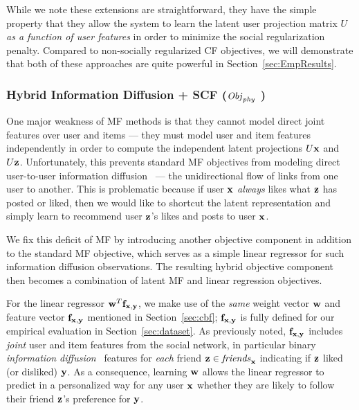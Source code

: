 While we note these extensions are straightforward, they have
the simple property that they allow the system to learn the latent
user projection matrix $U$ \emph{as a function of user features}
in order to minimize the social regularization penalty.
Compared to non-socially regularized CF objectives, we will
demonstrate that both of these approaches are quite powerful in 
Section~\ref{sec:EmpResults}.


\subsubsection{Hybrid Information Diffusion + SCF ($\mathit{Obj}_{\mathit{phy}}$ )}

One major weakness of MF methods is that they cannot model direct
joint features over user and items --- they must model user and item
features independently in order to compute the independent latent
projections $U\mathbf{x}$ and $U\mathbf{z}$.  Unfortunately, this prevents standard MF
objectives from modeling direct user-to-user information
diffusion~\cite{inf_diffusion} --- the 
unidirectional flow of links from one user to another.
This is problematic because if user $\mathbf{x}$ \emph{always} likes what $\mathbf{z}$
has posted or liked, then we would like to shortcut the latent
representation and simply learn to recommend user $\mathbf{z}$'s likes and posts 
to user $\mathbf{x}$.

We fix this deficit of MF by introducing another objective component
in addition to the standard MF objective, which serves as
a simple linear regressor for such information diffusion
observations.  The resulting hybrid objective component then becomes a
combination of latent MF and linear regression objectives.

For the linear regressor $\mathbf{w}^T \mathbf{f}_{\mathbf{x},\mathbf{y}}$, we make use of the
\emph{same} weight vector $\mathbf{w}$ and feature vector $\mathbf{f}_{\mathbf{x},\mathbf{y}}$
mentioned in Section~\ref{sec:cbf}; $\mathbf{f}_{\mathbf{x},\mathbf{y}}$ is fully defined for
our empirical evaluation in Section~\ref{sec:dataset}.  As previously
noted, $\mathbf{f}_{\mathbf{x},\mathbf{y}}$ includes
\emph{joint} user and item features from the social network, in
particular binary
\emph{information diffusion}~\cite{inf_diffusion} features
for \emph{each} friend $\mathbf{z} \in \mathit{friends}_{\mathbf{x}}$ indicating if $\mathbf{z}$
liked (or disliked) $\mathbf{y}$.  As a consequence, learning $\mathbf{w}$ allows the
linear regressor to predict in a personalized way for any user $\mathbf{x}$
whether they are likely to follow their friend $\mathbf{z}$'s preference for $\mathbf{y}$.

